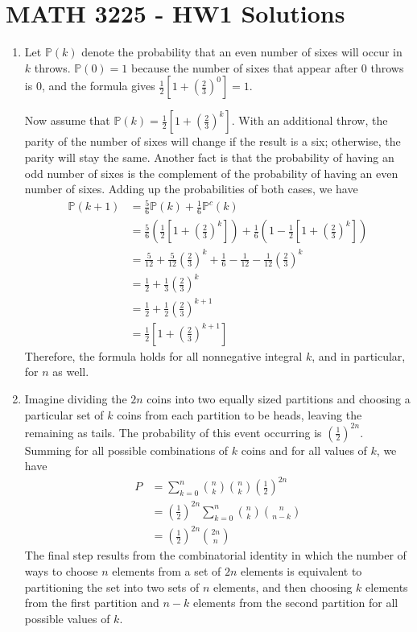 \documentclass[a4paper,12pt]{article}
\begin{document}
\section*{MATH 3225 - HW1 Solutions}

\begin{enumerate}
	
	\item Let $\mathbb{P}(k)$ denote the probability that an even number of sixes will occur in $k$ throws. $\mathbb{P}(0) = 1$ because the number of sixes that appear after $0$ throws is $0$, and the formula gives $\frac{1}{2} [1 + \left( \frac{2}{3} \right)^0] = 1.$ \par
	Now assume that $\mathbb{P}(k) = \frac{1}{2} [1 + \left( \frac{2}{3} \right)^k]$. With an additional throw, the parity of the number of sixes will change if the result is a six; otherwise, the parity will stay the same. Another fact is that the probability of having an odd number of sixes is the complement of the probability of having an even number of sixes. Adding up the probabilities of both cases, we have
	\begin{align*}
        \mathbb{P}(k + 1) &= \frac{5}{6} \mathbb{P}(k) + \frac{1}{6} \mathbb{P}^c(k) \\
		&= \frac{5}{6} \left( \frac{1}{2} \left[ 1 + \left( \frac{2}{3} \right)^k \right] \right) + \frac{1}{6} \left( 1 - \frac{1}{2} \left[ 1 + \left( \frac{2}{3} \right)^k \right] \right) \\
		&= \frac{5}{12} + \frac{5}{12} \left( \frac{2}{3} \right)^k + \frac{1}{6} - \frac{1}{12} - \frac{1}{12} \left( \frac{2}{3} \right)^k \\
		&= \frac{1}{2} + \frac{1}{3} \left( \frac{2}{3} \right)^k \\
		&= \frac{1}{2} + \frac{1}{2} \left( \frac{2}{3} \right)^{k + 1} \\
		&= \frac{1}{2} \left[ 1 + \left( \frac{2}{3} \right)^{k + 1} \right]
	\end{align*}
	Therefore, the formula holds for all nonnegative integral $k$, and in particular, for $n$ as well.

	\setcounter{enumi}{8}
	\item Imagine dividing the $2n$ coins into two equally sized partitions and choosing a particular set of $k$ coins from each partition to be heads, leaving the remaining as tails. The probability of this event occurring is $\left( \frac{1}{2} \right)^{2n}$. Summing for all possible combinations of $k$ coins and for all values of $k$, we have
	\begin{align*}
	P &= \sum_{k = 0}^{n} \binom{n}{k} \binom{n}{k} \left( \frac{1}{2} \right)^{2n} \\
	&= \left( \frac{1}{2} \right)^{2n} \sum_{k = 0}^{n} \binom{n}{k} \binom{n}{n - k} \\
	&= \left( \frac{1}{2} \right)^{2n} \binom{2n}{n}
	\end{align*}
	The final step results from the combinatorial identity in which the number of ways to choose $n$ elements from a set of $2n$ elements is equivalent to partitioning the set into two sets of $n$ elements, and then choosing $k$ elements from the first partition and $n - k$ elements from the second partition for all possible values of $k$.


\end{enumerate}
\end{document}

